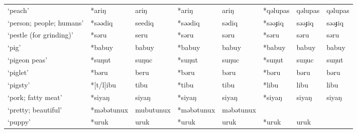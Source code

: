 \begin{landscape}
\begin{longtable}[c]{@{}p{3cm}<{\raggedright}p{2.75cm}<{\raggedright}p{2.75cm}<{\raggedright}p{2.75cm}<{\raggedright}p{2.75cm}<{\raggedright}p{2.75cm}<{\raggedright}p{2.75cm}<{\raggedright}p{2.75cm}<{\raggedright}@{}}
`peach'                                              & *ariŋ        & ariŋ                          & *ariŋ          & ariŋ                       & *qəlupas         & qəlupas                  & qəlupas                           \\
`person; people; humans'                             & *səədiq      & seediq                        & *səədiq        & sədiq                      & *səəɟiq          & səəɟiq                   & səəɟiq                            \\
`pestle (for grinding)'                              & *səru        & seru                          & *səru          & səru                       & *səru            & səru                     & səru                              \\
`pig'                                                & *babuy       & babuy                         & *babuy         & babuy                      & *babuy           & babuy                    & babuy                             \\
`pigeon peas'                                        & *suŋut       & suŋuc                         & *suŋut         & suŋuc                      & *suŋut           & suŋuc                    & suŋut                             \\
`piglet'                                             & *bəru        & beru                          & *bəru          & bəru                       & *bəru            & bəru                     & bəru                              \\
`pigsty'                                             & *[t/l]ibu    & tibu                          & *tibu          & tibu                       & *libu            & libu                     & libu                              \\
`pork; fatty meat'                                   & *siyaŋ       & siyaŋ                         & *siyaŋ         & siyaŋ                      & *siyaŋ           & siyaŋ                    & siyaŋ                             \\
`pretty; beautiful'                                  & *məbətunux   & mubutunux                     & *məbətunux     & məbətunux                  &                  &                          &                                   \\
`puppy'                                              & *uruk        & uruk                          & *uruk          & uruk                       & *uruk            & uruk                     &                                   \\

\end{longtable}
\end{landscape}
